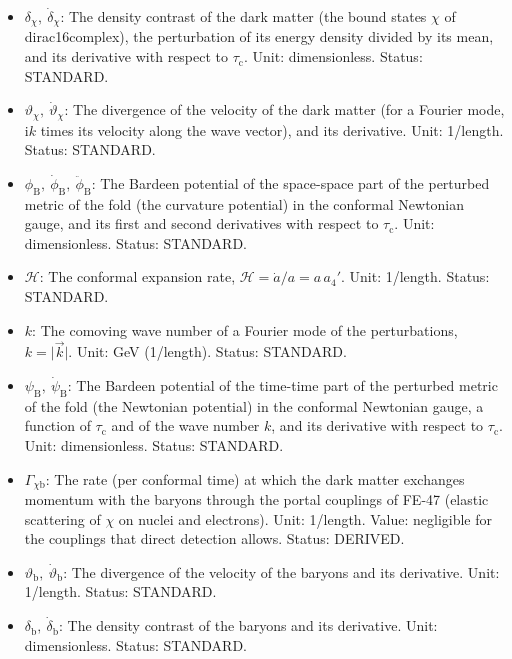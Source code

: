 \documentclass[
  10pt,
]{article}
\providecommand{\tightlist}{%
  \setlength{\itemsep}{0pt}\setlength{\parskip}{0pt}}
\begin{document}
\begin{itemize}
\tightlist
\item
  \(\delta_\chi,\ \dot\delta_\chi\): The density contrast of the dark
  matter (the bound states \(\chi\) of dirac16complex), the perturbation
  of its energy density divided by its mean, and its derivative with
  respect to \(\tau_{\mathrm{c}}\). Unit: dimensionless. Status:
  STANDARD.
\item
  \(\vartheta_\chi,\ \dot\vartheta_\chi\): The divergence of the
  velocity of the dark matter (for a Fourier mode, \(\mathrm{i}k\) times
  its velocity along the wave vector), and its derivative. Unit:
  1/length. Status: STANDARD.
\item
  \(\phi_{\mathrm{B}},\ \dot\phi_{\mathrm{B}},\ \ddot\phi_{\mathrm{B}}\):
  The Bardeen potential of the space-space part of the perturbed metric
  of the fold (the curvature potential) in the conformal Newtonian
  gauge, and its first and second derivatives with respect to
  \(\tau_{\mathrm{c}}\). Unit: dimensionless. Status: STANDARD.
\item
  \(\mathcal{H}\): The conformal expansion rate,
  \(\mathcal{H} = \dot a/a = a\,a_4'\). Unit: 1/length. Status:
  STANDARD.
\item
  \(k\): The comoving wave number of a Fourier mode of the
  perturbations, \(k = \lvert\vec k\rvert\). Unit: GeV (1/length).
  Status: STANDARD.
\item
  \(\psi_{\mathrm{B}},\ \dot\psi_{\mathrm{B}}\): The Bardeen potential
  of the time-time part of the perturbed metric of the fold (the
  Newtonian potential) in the conformal Newtonian gauge, a function of
  \(\tau_{\mathrm{c}}\) and of the wave number \(k\), and its derivative
  with respect to \(\tau_{\mathrm{c}}\). Unit: dimensionless. Status:
  STANDARD.
\item
  \(\Gamma_{\chi\mathrm{b}}\): The rate (per conformal time) at which
  the dark matter exchanges momentum with the baryons through the portal
  couplings of FE-47 (elastic scattering of \(\chi\) on nuclei and
  electrons). Unit: 1/length. Value: negligible for the couplings that
  direct detection allows. Status: DERIVED.
\item
  \(\vartheta_{\mathrm{b}},\ \dot\vartheta_{\mathrm{b}}\): The
  divergence of the velocity of the baryons and its derivative. Unit:
  1/length. Status: STANDARD.
\item
  \(\delta_{\mathrm{b}},\ \dot\delta_{\mathrm{b}}\): The density
  contrast of the baryons and its derivative. Unit: dimensionless.
  Status: STANDARD.

\end{itemize}
\end{document}
